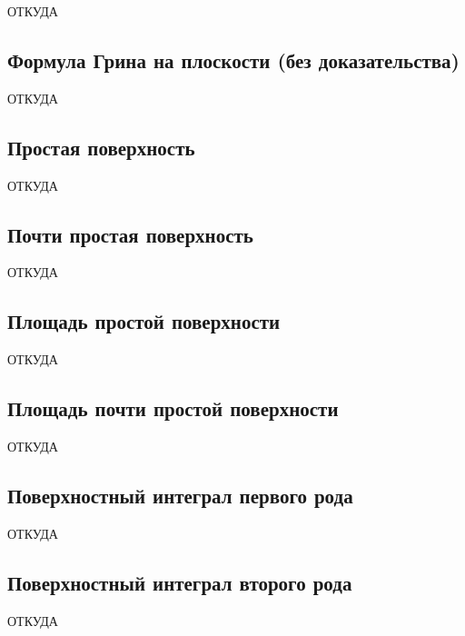 ОТКУДА

\subsection{Формула Грина на плоскости (без доказательства)}

ОТКУДА

\subsection{Простая поверхность}

ОТКУДА

\subsection{Почти простая поверхность}

ОТКУДА

\subsection{Площадь простой поверхности}

ОТКУДА

\subsection{Площадь почти простой поверхности}

ОТКУДА

\subsection{Поверхностный интеграл первого рода}

ОТКУДА

\subsection{Поверхностный интеграл второго рода}

ОТКУДА